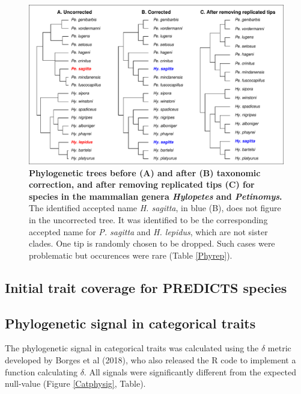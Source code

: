 \documentclass[11pt]{article}
\begin{document}
\begin{figure}[h!]
\centering
\includegraphics[scale=0.7]{figures/Case_studies/Case3}
\caption[Phylogenetic trees before (A) and after (B) taxonomic correction, and after removing replicated tips (C) for species in the mammalian genera \textit{Hylopetes} and \textit{Petinomys}]{\textbf{Phylogenetic trees before (A) and after (B) taxonomic correction, and after removing replicated tips (C) for species in the mammalian genera \textit{Hylopetes} and \textit{Petinomys}.} The identified accepted name \textit{H. sagitta}, in blue (B), does not figure in the uncorrected tree. It was identified to be the corresponding accepted name for \textit{P. sagitta} and \textit{H. lepidus}, which are not sister clades. One tip is randomly chosen to be dropped. Such cases were problematic but occurences were rare (Table \ref{Phyrep}).}
\label{case3}
\end{figure}

\pagebreak
\subsection{Initial trait coverage for PREDICTS species}

\pagebreak
\subsection{Phylogenetic signal in categorical traits}
The phylogenetic signal in categorical traits was calculated using the $\delta$ metric developed by Borges et al (2018), who also released the R code to implement a function calculating $\delta$. All signals were significantly different from the expected null-value (Figure \ref{Catphysig}, Table).
\end{document}

